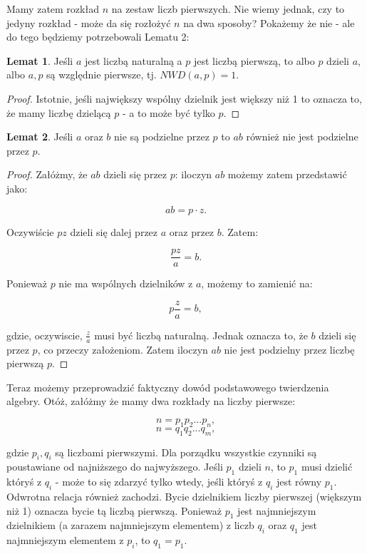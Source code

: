 \documentclass[11pt]{article}
\theoremstyle{definition}
\numberwithin{zad}{section}
\newtheorem{lemma}{Lemat}
\begin{document}
Mamy zatem rozkład $n$ na zestaw liczb pierwszych. Nie wiemy jednak, czy to jedyny rozkład - może da się rozłożyć $n$ na dwa sposoby? Pokażemy że nie - ale do tego będziemy potrzebowali Lematu 2:

\begin{lemma}
Jeśli $a$ jest liczbą naturalną a $p$ jest liczbą pierwszą, to albo $p$ dzieli $a$, albo $a, p$ są względnie pierwsze, tj. $NWD(a,p)=1$.
\end{lemma}
\begin{proof}
Istotnie, jeśli największy wspólny dzielnik jest większy niż 1 to oznacza to, że mamy liczbę dzielącą $p$ - a to może być tylko $p$.
\end{proof}

\begin{lemma}
Jeśli $a$ oraz $b$ nie są podzielne przez $p$ to $ab$ również nie jest podzielne przez $p$.
\end{lemma}

\begin{proof}
Załóżmy, że $ab$ dzieli się przez $p$: iloczyn $ab$ możemy zatem przedstawić jako:

$$ab = p\cdot z.$$

Oczywiście $pz$ dzieli się dalej przez $a$ oraz przez $b$. Zatem:

$$\frac{pz}{a} = b.$$

Ponieważ $p$ nie ma wspólnych dzielników z $a$, możemy to zamienić na:

$$p\frac{z}{a} = b,$$

gdzie, oczywiscie, $\frac za$ musi być liczbą naturalną. Jednak oznacza to, że $b$ dzieli się przez $p$, co przeczy założeniom. Zatem iloczyn $ab$ nie jest podzielny przez liczbę pierwszą $p$.
\end{proof}


Teraz możemy przeprowadzić faktyczny dowód podstawowego twierdzenia algebry. Otóż, załóżmy że mamy dwa rozkłady na liczby pierwsze:

$$n = p_1p_2...p_n,$$
$$n = q_1q_2...q_m,$$

gdzie $p_i, q_i$ są liczbami pierwszymi. Dla porządku wszystkie czynniki są poustawiane od najniższego do najwyższego. Jeśli $p_1$ dzieli $n$, to $p_1$ musi dzielić któryś z $q_i$ - może to się zdarzyć tylko wtedy, jeśli któryś z $q_i$ jest równy $p_1$. Odwrotna relacja również zachodzi. Bycie dzielnikiem liczby pierwszej (większym niż 1) oznacza bycie tą liczbą pierwszą. Ponieważ $p_1$ jest najmniejszym dzielnikiem (a zarazem najmniejszym elementem) z liczb $q_i$ oraz $q_1$ jest najmniejszym elementem z $p_i$, to $q_1 = p_1$.
\end{document}
